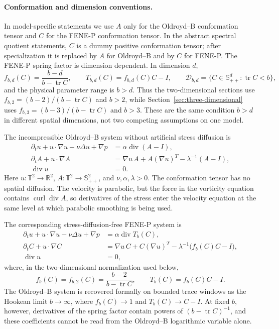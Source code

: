 \documentclass[11pt]{article}
\newcommand{\T}{\mathbb T}
\newcommand{\R}{\mathbb R}
\newcommand{\Id}{I}
\newcommand{\Spp}{\mathbb S_{++}}
\newcommand{\tr}{\operatorname{tr}}
\newcommand{\divv}{\operatorname{div}}
\newcommand{\curl}{\operatorname{curl}}
\newcommand{\calD}{\mathcal D}
\begin{document}
\paragraph{Conformation and dimension conventions.}
In model-specific statements we use \(A\) only for the Oldroyd--B conformation
tensor and \(C\) for the FENE-P conformation tensor.  In the abstract spectral
quotient statements, \(C\) is a dummy positive conformation tensor; after
specialization it is replaced by \(A\) for Oldroyd--B and by \(C\) for FENE-P.
The FENE-P spring factor is dimension dependent.  In dimension \(d\),
\[
  f_{b,d}(C)=\frac{b-d}{b-\tr C},\qquad
  T_{b,d}(C)=f_{b,d}(C)C-I,
  \qquad
  \calD_{b,d}=\{C\in\Spp^d:\tr C<b\},
\]
and the physical parameter range is \(b>d\).  Thus the two-dimensional sections
use \(f_{b,2}=(b-2)/(b-\tr C)\) and \(b>2\), while
Section~\ref{sec:three-dimensional} uses \(f_{b,3}=(b-3)/(b-\tr C)\) and
\(b>3\).  These are the same condition \(b>d\) in different spatial dimensions,
not two competing assumptions on one model.

The incompressible Oldroyd--B system without artificial stress diffusion is
\begin{align}
  \partial_t u+u\cdot\nabla u-\nu\Delta u+\nabla p
    &= \alpha\divv(A-\Id), \label{eq:ob-momentum}\\
  \partial_t A+u\cdot\nabla A
    &= \nabla u\,A+A(\nabla u)^T-\lambda^{-1}(A-\Id),
    \label{eq:ob-conformation}\\
  \divv u&=0.
\end{align}
Here \(u:\T^2\to\R^2\), \(A:\T^2\to\Spp^2\), and
\(\nu,\alpha,\lambda>0\).  The conformation tensor has no spatial diffusion.
The velocity is parabolic, but the force in the vorticity equation contains
\(\curl\divv A\), so derivatives of the stress enter the velocity equation at
the same level at which parabolic smoothing is being used.

The corresponding stress-diffusion-free FENE-P system is
\begin{align}
  \partial_t u+u\cdot\nabla u-\nu\Delta u+\nabla p
    &= \alpha\divv T_b(C), \label{eq:fene-momentum}\\
  \partial_t C+u\cdot\nabla C
    &= \nabla u\,C+C(\nabla u)^T
      -\lambda^{-1}\bigl(f_b(C)C-\Id\bigr),
    \label{eq:fene-conformation}\\
  \divv u&=0,
\end{align}
where, in the two-dimensional normalization used below,
\[
  f_b(C)=f_{b,2}(C)=\frac{b-2}{b-\tr C},\qquad T_b(C)=f_b(C)C-\Id .
\]
The Oldroyd--B system is recovered formally on bounded trace windows as the
Hookean limit \(b\to\infty\), where \(f_b(C)\to1\) and
\(T_b(C)\to C-\Id\).  At fixed \(b\), however, derivatives of the spring
factor contain powers of \((b-\tr C)^{-1}\), and these coefficients cannot be
read from the Oldroyd--B logarithmic variable alone.
\end{document}
